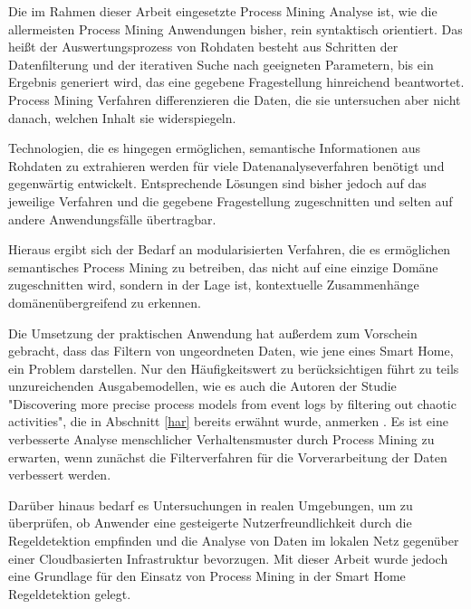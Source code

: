 Die im Rahmen dieser Arbeit eingesetzte Process Mining Analyse ist, wie die allermeisten Process Mining Anwendungen bisher, rein syntaktisch orientiert. Das heißt der Auswertungsprozess von Rohdaten besteht aus Schritten der Datenfilterung und der iterativen Suche nach geeigneten Parametern, bis ein Ergebnis generiert wird, das eine gegebene Fragestellung hinreichend beantwortet. Process Mining Verfahren differenzieren die Daten, die sie untersuchen aber nicht danach, welchen Inhalt sie widerspiegeln. 

Technologien, die es hingegen ermöglichen, semantische Informationen aus Rohdaten zu extrahieren werden für viele Datenanalyseverfahren benötigt und gegenwärtig entwickelt. Entsprechende Lösungen sind bisher jedoch auf das jeweilige Verfahren und die gegebene Fragestellung zugeschnitten und selten auf andere Anwendungsfälle übertragbar. 

Hieraus ergibt sich der Bedarf an modularisierten Verfahren, die es ermöglichen semantisches Process Mining zu betreiben, das nicht auf eine einzige Domäne zugeschnitten wird, sondern in der Lage ist, kontextuelle Zusammenhänge domänenübergreifend zu erkennen.

Die Umsetzung der praktischen Anwendung hat außerdem zum Vorschein gebracht, dass das Filtern von ungeordneten Daten, wie jene eines Smart Home, ein Problem darstellen. Nur den Häufigkeitswert zu berücksichtigen führt zu teils unzureichenden Ausgabemodellen, wie es auch die Autoren der Studie "Discovering more precise process models from event logs by filtering out chaotic activities", die in Abschnitt \ref{har} bereits erwähnt wurde, anmerken \cite{Tax2019}. Es ist eine verbesserte Analyse menschlicher Verhaltensmuster durch Process Mining zu erwarten, wenn zunächst die Filterverfahren für die Vorverarbeitung der Daten verbessert werden.

Darüber hinaus bedarf es Untersuchungen in realen Umgebungen, um zu überprüfen, ob Anwender eine gesteigerte Nutzerfreundlichkeit durch die Regeldetektion empfinden und die Analyse von Daten im lokalen Netz gegenüber einer Cloudbasierten Infrastruktur bevorzugen. Mit dieser Arbeit wurde jedoch eine Grundlage für den Einsatz von Process Mining in der Smart Home Regeldetektion gelegt.